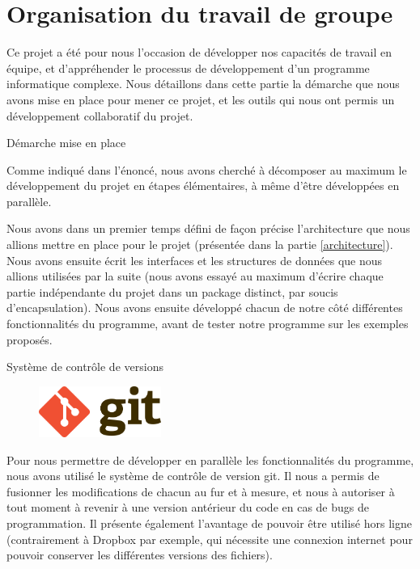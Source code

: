 \documentclass[a4paper,twoside,12pt]{article}
\newcounter{partie}
\newcounter{sous-partie}
\newenvironment{partie}[1]
{
\section{#1}
}
{

}
\newenvironment{sous-partie}[1]
{
\subsection{#1}
}
{

}
\begin{document}
\begin{partie}{Organisation du travail de groupe}

Ce projet a été pour nous l'occasion de développer nos capacités de travail en équipe, et d'appréhender le processus de développement d'un programme informatique complexe. Nous détaillons dans cette partie la démarche que nous avons mise en place pour mener ce projet, et les outils qui nous ont permis un développement collaboratif du projet.

\begin{sous-partie}{Démarche mise en place}
\begin{paragraph}{}
Comme indiqué dans l'énoncé, nous avons cherché à décomposer au maximum le développement du projet en étapes élémentaires, à même d'être développées en parallèle.
\end{paragraph}
\begin{paragraph}{}
Nous avons dans un premier temps défini de façon précise l'architecture que nous allions mettre en place pour le projet (présentée dans la partie \ref{architecture}). Nous avons ensuite écrit les interfaces et les structures de données que nous allions utilisées par la suite (nous avons essayé au maximum d'écrire chaque partie indépendante du projet dans un package distinct, par soucis d'encapsulation). Nous avons ensuite développé chacun de notre côté différentes fonctionnalités du programme, avant de tester notre programme sur les exemples proposés.
\end{paragraph}
\end{sous-partie}

\begin{sous-partie}{Système de contrôle de versions}
\begin{figure}[htb]
\centering
\includegraphics[width=4cm]{./images/git.png}
\end{figure}

\begin{paragraph}{}
Pour nous permettre de développer en parallèle les fonctionnalités du programme, nous avons utilisé le système de contrôle de version git. Il nous a permis de fusionner les modifications de chacun au fur et à mesure, et nous à autoriser à tout moment à revenir à une version antérieur du code en cas de bugs de programmation. Il présente également l'avantage de pouvoir être utilisé hors ligne (contrairement à Dropbox par exemple, qui nécessite une connexion internet pour pouvoir conserver les différentes versions des fichiers).
\end{paragraph}


\end{sous-partie}
\end{partie}
\end{document}
